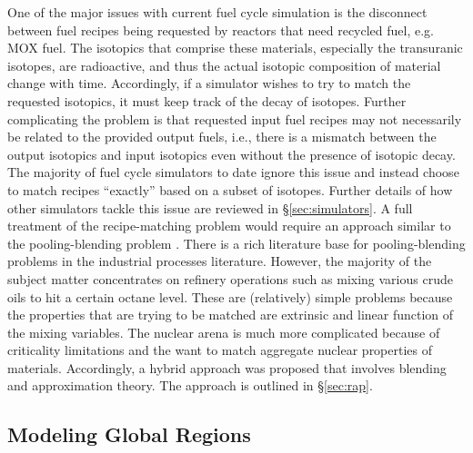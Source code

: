 One of the major issues with current fuel cycle simulation is the disconnect
between fuel recipes being requested by reactors that need recycled fuel,
e.g. MOX fuel. The isotopics that comprise these materials, especially the
transuranic isotopes, are radioactive, and thus the actual isotopic composition
of material change with time. Accordingly, if a simulator wishes to try to match
the requested isotopics, it must keep track of the decay of isotopes. Further
complicating the problem is that requested input fuel recipes may not
necessarily be related to the provided output fuels, i.e., there is a mismatch
between the output isotopics and input isotopics even without the presence of
isotopic decay. The majority of fuel cycle simulators to date ignore this issue
and instead choose to match recipes ``exactly'' based on a subset of
isotopes. Further details of how other simulators tackle this issue are reviewed
in \S\ref{sec:simulators}. A full treatment of the recipe-matching problem would
require an approach similar to the pooling-blending problem
\cite{tawarmalani_convexification_2002}. There is a rich literature base for
pooling-blending problems
\cite{glen_mixed_1988,rigby_evolution_1995,mendez_simultaneous_2006,misener_advances_2009}
in the industrial processes literature. However, the majority of the subject
matter concentrates on refinery operations such as mixing various crude oils to
hit a certain octane level. These are (relatively) simple problems because the
properties that are trying to be matched are extrinsic and linear function of
the mixing variables. The nuclear arena is much more complicated because of
criticality limitations and the want to match aggregate nuclear properties of
materials. Accordingly, a hybrid approach was proposed that involves blending and
approximation theory. The approach is outlined in \S\ref{sec:rap}.

\subsection{Modeling Global Regions}

